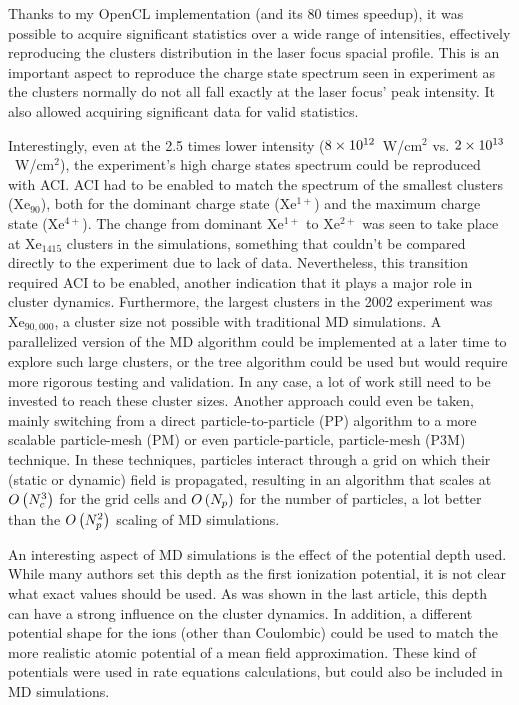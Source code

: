 Thanks to my OpenCL implementation (and its 80 times speedup), it was possible
to acquire significant statistics over a wide range of intensities, effectively
reproducing the clusters distribution in the laser focus spacial profile. This
is an important aspect to reproduce the charge state spectrum seen in experiment
as the clusters normally do not all fall exactly at the laser focus' peak
intensity. It also allowed acquiring significant data for valid statistics.

Interestingly, even at the 2.5 times lower intensity ($\ten{8}{12}$~W/cm$^{2}$
vs. $\ten{2}{13}$~W/cm$^{2}$), the experiment's high charge states spectrum
could be reproduced with ACI. ACI had to
be enabled to match the spectrum of the smallest clusters (Xe$_{90}$), both
for the dominant charge state (Xe$^{1+}$) and the maximum charge state (Xe$^{4+}$).
The change from dominant Xe$^{1+}$ to Xe$^{2+}$ was seen to take place at
Xe$_{1415}$ clusters in the simulations, something that couldn't be compared
directly to the experiment due to lack of data. Nevertheless, this transition
required ACI to be
enabled, another indication that it plays a major role in cluster dynamics.
Furthermore, the largest clusters in the 2002 experiment was Xe$_{90,000}$, a
cluster size not possible with traditional MD simulations. A parallelized
version of the MD algorithm could be implemented at a later time to explore such
large clusters, or the tree algorithm could be used but would require more
rigorous testing and validation. In any case, a lot of work still need to be
invested to reach these cluster sizes. Another approach could even be taken,
mainly switching from a direct particle-to-particle (PP) algorithm to a more
scalable particle-mesh (PM) or even particle-particle, particle-mesh (P3M)
technique. In these techniques, particles interact through a grid on which their
(static or dynamic) field is propagated, resulting in an algorithm that scales
at $O\left( N_c^3 \right)$ for the grid cells and $O\left( N_p \right)$ for the number of particles,
a lot better than the $O\left( N_p^2 \right)$ scaling of MD simulations.

An interesting aspect of MD simulations is the effect of the potential depth
used. While many authors set this depth as the first ionization potential, it
is not clear what exact values should be used. As was shown in the last article,
this depth can have a strong influence on the cluster dynamics. In addition, a
different potential shape for the ions (other than Coulombic) could be used to
match the more realistic atomic potential of a mean field approximation. These
kind of potentials were used in rate equations calculations, but could also be
included in MD simulations.



